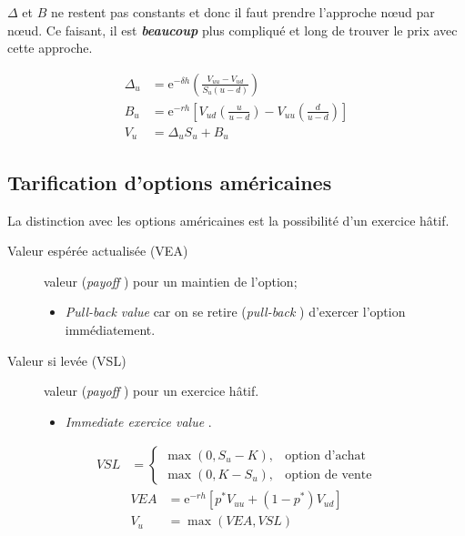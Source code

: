 \documentclass[10pt, french]{article}
\begin{document}
\begin{multicols*}{2}
$\Delta$ et $B$ ne restent pas constants et donc il faut prendre l'approche nœud par nœud. Ce faisant, il est \textit{\textbf{beaucoup}} plus compliqué et long de trouver le prix avec cette approche.

\begin{distributions}
\begin{align*}
	\Delta_{u}	&=	\textrm{e}^{-\delta h}\left( \frac{V_{uu} - V_{ud}}{S_{u}(u - d)} \right)	\\
	B_{u}	&=	\textrm{e}^{-r h} \left[ V_{ud}\left(	\frac{u}{u - d}\right) - V_{uu} \left(\frac{d}{u - d}\right) \right]	\\
	V_{u}	&=	\Delta_{u} S_{u} + B_{u}
\end{align*}
\end{distributions}

\columnbreak
\subsection{Tarification d'options américaines}
La distinction avec les options américaines est la possibilité d'un exercice hâtif.

\begin{description}
	\item[Valeur espérée actualisée (VEA)]	valeur (\og \textit{payoff} \fg{}) pour un maintien de l'option;
		\begin{itemize}[leftmargin = *]
		\item	\og \textit{Pull-back value}\fg{} car on se retire (\og \textit{pull-back} \fg{}) d'exercer l'option immédiatement.
		\end{itemize}
	\item[Valeur si levée (VSL)]	valeur (\og \textit{payoff} \fg{}) pour un exercice hâtif.
		\begin{itemize}[leftmargin = *]
		\item	\og \textit{Immediate exercice value} \fg{}.
		\end{itemize}
\end{description}

\begin{distributions}
\begin{align*}
VSL	&=	
	\begin{cases}
	\max(0, S_{u} - K),	&	\text{option d'achat}	\\
	\max(0, K - S_{u}),	&	\text{option de vente}
	\end{cases}
\end{align*}
\begin{align*}
	VEA	
	&=		\textrm{e}^{-r h}\left[ p^{*}V_{uu} + (1 - p^{*})V_{ud} \right]	\\
	V_{u}	
	&=	\max(VEA, VSL)
\end{align*}
\end{distributions}


\end{multicols*}
\end{document}
